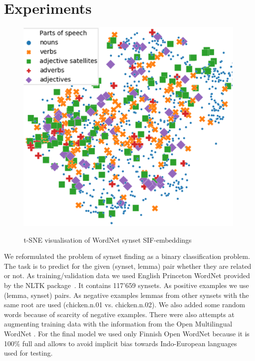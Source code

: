 \documentclass[11pt,a4paper]{article}
\begin{document}
\section{Experiments}
\begin{figure}
	
	\centering
	\small
	\includegraphics[scale=0.5]{wordnet-pos3}\\
	
	\caption{t-SNE visualisation of WordNet synset SIF-embeddings}
	\label{wordnet-pos}
\end{figure}
We reformulated the problem of synset finding as a binary classification problem. The task is to predict for the given (synset, lemma) pair whether they are related or not. As training/validation data we used English Princeton WordNet \cite{wordnet} provided by the NLTK package~\cite{nltk}. It contains 117'659 synsets. As positive examples we use (lemma, synset) pairs. As negative examples lemmas from other synsets with the same root are used (chicken.n.01 vs. chicken.n.02). We also added some random words because of scarcity of negative examples. There were also attempts at augmenting training data with the information from the Open Multilingual WordNet \cite{bond-wordnet}. For the final model we used only Finnish Open WordNet because it is 100\% full and allows to avoid implicit bias towards Indo-European languages used for testing.
\end{document}
